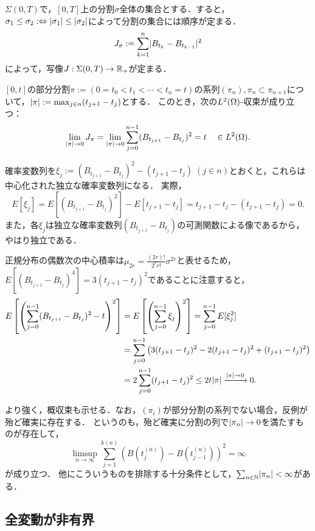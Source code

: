\documentclass[uplatex,dvipdfmx]{jsreport}
\begin{document}
\begin{notation}
    $\Sigma(0,T)$で，$[0,T]$上の分割$\sigma$全体の集合とする．すると，$\sigma_1\le\sigma_2:\Leftrightarrow\lvert\sigma_1\rvert\le\lvert\sigma_2\rvert$によって分割の集合には順序が定まる．
    \[J_\sigma:=\sum_{k=1}^n\lvert B_{t_k}-B_{t_{k-1}}\rvert^2\]
    によって，写像$J:\Sigma(0,T)\to\mathbb{R}_+$が定まる．
\end{notation}

\begin{proposition}[2次変動の$L^2$-収束]
    $[0,t]$の部分分割$\pi:=(0=t_0<t_1<\cdots<t_n=t)$の系列$(\pi_n),\pi_n\subset\pi_{n+1}$について，$\lvert\pi\rvert:=\max_{j\in n}(t_{j+1}-t_j)$とする．
    このとき，次の$L^2(\Omega)$-収束が成り立つ：
    \[\lim_{\lvert\pi\rvert\to0}J_\pi=\lim_{\lvert\pi\rvert\to0}\sum^{n-1}_{j=0}(B_{t_{j+1}}-B_{t_j})^2=t\quad\in L^2(\Omega).\]
\end{proposition}
\begin{Proof}
    確率変数列を$\xi_j:=(B_{t_{j+1}}-B_{t_j})^2-(t_{j+1}-t_j)\;(j\in n)$とおくと，これらは中心化された独立な確率変数列になる．
    実際，
    \[E[\xi_j]=E[(B_{t_{j+1}}-B_{t_j})^2]-E[t_{j+1}-t_j]=t_{j+1}-t_j-(t_{j+1}-t_j)=0.\]
    また，各$\xi_j$は独立な確率変数列$(B_{t_{j+1}}-B_{t_j})$の可測関数による像であるから，やはり独立である．
    
    正規分布の偶数次の中心積率は$\mu_{2r}=\frac{(2r)!}{2^rr!}\sigma^{2r}$と表せるため，$E[(B_{t_{j+1}}-B_{t_j})^4]=3(t_{j+1}-t_j)^2$であることに注意すると，
    \begin{align*}
        E\left[\left(\sum^{n-1}_{j=0}(B_{t_{j+1}}-B_{t_j})^2-t\right)^2\right]&=E\left[\left(\sum^{n-1}_{j=0}\xi_j\right)^2\right]=\sum^{n-1}_{j=0}E[\xi^2_j]\\
        &=\sum^{n-1}_{j=0}\left(3(t_{j+1}-t_j)^2-2(t_{j+1}-t_j)^2+(t_{j+1}-t_j)^2\right)\\
        &=2\sum^{n-1}_{j=0}(t_{j+1}-t_j)^2\le 2t\lvert\pi\rvert\xrightarrow{\lvert\pi\rvert\to0}0.
    \end{align*}
\end{Proof}
\begin{remark}
    より強く，概収束も示せる．なお，$(\pi_i)$が部分分割の系列でない場合，反例が殆ど確実に存在する．
    というのも，殆ど確実に分割の列で$\lvert\pi_n\rvert\to 0$を満たすものが存在して，
    \[\limsup_{n\to\infty}\sum^{k(n)}_{j=1}(B(t_j^{(n)})-B(t^{(n)}_{j-1}))^2=\infty\]
    が成り立つ．
    他にこういうものを排除する十分条件として，$\sum_{n\in\mathbb{N}}\lvert\pi_n\rvert<\infty$がある．
\end{remark}

\subsection{全変動が非有界}
\end{document}
